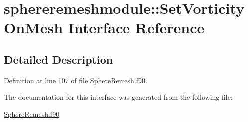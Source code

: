 \hypertarget{interfacesphereremeshmodule_1_1SetVorticityOnMesh}{\section{sphereremeshmodule\+:\+:Set\+Vorticity\+On\+Mesh Interface Reference}
\label{interfacesphereremeshmodule_1_1SetVorticityOnMesh}
}


\subsection{Detailed Description}


Definition at line 107 of file Sphere\+Remesh.\+f90.



The documentation for this interface was generated from the following file\+:\begin{DoxyCompactItemize}
\item 
\hyperlink{SphereRemesh_8f90}{Sphere\+Remesh.\+f90}\end{DoxyCompactItemize}
